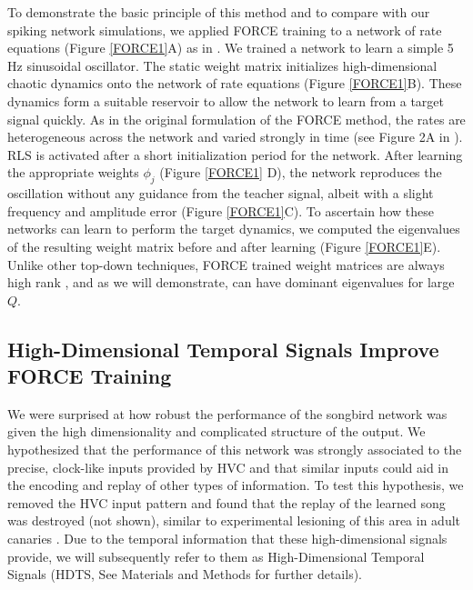 \documentclass[11pt]{article} %
\begin{document}
To demonstrate the basic principle of this method and to compare with our spiking network simulations, 
we applied FORCE training to a network of rate equations (Figure \ref{FORCE1}A) as in \cite{FORCE1}.  
We trained a network to learn a simple 5 Hz sinusoidal oscillator.  
The static weight matrix initializes high-dimensional chaotic dynamics onto the network of rate equations 
(Figure \ref{FORCE1}B).  These dynamics form a suitable reservoir to allow the network to learn from a 
target signal quickly.   As in the original formulation of the FORCE method, the rates are 
heterogeneous across the network and varied strongly in time (see Figure 2A in \cite{FORCE1}). 
RLS is activated after a short initialization period for the network.  
After learning the appropriate weights $\phi_j $ (Figure \ref{FORCE1} D), 
the network reproduces the oscillation without any guidance from the teacher signal, 
albeit with a slight frequency and amplitude error (Figure \ref{FORCE1}C).   
To ascertain how these networks can learn to perform the target dynamics, 
we computed the eigenvalues of the resulting weight matrix before and after learning 
(Figure \ref{FORCE1}E).  Unlike other top-down techniques, FORCE trained weight matrices are always 
high rank \cite{AbbottR}, and as we will demonstrate, can have dominant eigenvalues for large $Q$.


\subsection*{High-Dimensional Temporal Signals Improve FORCE Training}

We were surprised at how robust the performance of the songbird network was given 
the high dimensionality and complicated structure of the output.  
We hypothesized that the performance of this network was strongly associated to the precise, 
clock-like inputs provided by HVC and that similar inputs could aid in the encoding and 
replay of other types of information.  To test this hypothesis, we removed the HVC input pattern 
and found that the replay of the learned song was destroyed (not shown), 
similar to experimental lesioning of this area in adult canaries \cite{nottebohm}.   
Due to the temporal information that these high-dimensional signals provide, 
we will subsequently refer to them as High-Dimensional Temporal Signals 
(HDTS, See Materials and Methods for further details).   
\end{document}
